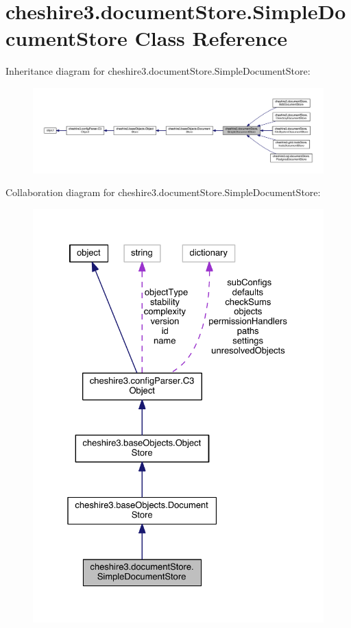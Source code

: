 \hypertarget{classcheshire3_1_1document_store_1_1_simple_document_store}{\section{cheshire3.\-document\-Store.\-Simple\-Document\-Store Class Reference}
\label{classcheshire3_1_1document_store_1_1_simple_document_store}
}


Inheritance diagram for cheshire3.\-document\-Store.\-Simple\-Document\-Store\-:
\nopagebreak
\begin{figure}[H]
\begin{center}
\leavevmode
\includegraphics[width=350pt]{classcheshire3_1_1document_store_1_1_simple_document_store__inherit__graph}
\end{center}
\end{figure}


Collaboration diagram for cheshire3.\-document\-Store.\-Simple\-Document\-Store\-:
\nopagebreak
\begin{figure}[H]
\begin{center}
\leavevmode
\includegraphics[width=327pt]{classcheshire3_1_1document_store_1_1_simple_document_store__coll__graph}
\end{center}
\end{figure}
